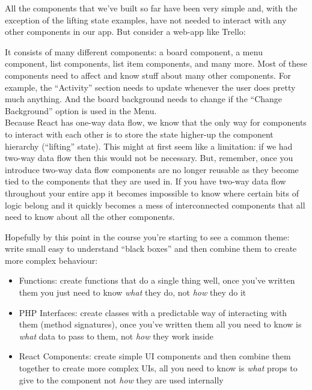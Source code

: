 

\pagebreak

All the components that we've built so far have been very simple and, with the exception of the lifting state examples, have not needed to interact with any other components in our app. But consider a web-app like Trello:


It consists of many different components: a board component, a menu component, list components, list item components, and many more. Most of these components need to affect and know stuff about many other components. For example, the ``Activity'' section needs to update whenever the user does pretty much anything. And the board background needs to change if the ``Change Background'' option is used in the Menu.
\\

Because React has one-way data flow, we know that the only way for components to interact with each other is to store the state higher-up the component hierarchy (``lifting'' state). This might at first seem like a limitation: if we had two-way data flow then this would not be necessary. But, remember, once you introduce two-way data flow components are no longer reusable as they become tied to the components that they are used in. If you have two-way data flow throughout your entire app it becomes impossible to know where certain bits of logic belong and it quickly becomes a mess of interconnected components that all need to know about all the other components.

\pagebreak

Hopefully by this point in the course you're starting to see a common theme: write small easy to understand ``black boxes'' and then combine them to create more complex behaviour:

\begin{itemize}
    \item Functions: create functions that do a single thing well, once you've written them you just need to know \textit{what} they do, not \textit{how} they do it
    \item PHP Interfaces: create classes with a predictable way of interacting with them (method signatures), once you've written them all you need to know is \textit{what} data to pass to them, not \textit{how} they work inside
    \item React Components: create simple UI components and then combine them together to create more complex UIs, all you need to know is \textit{what} props to give to the component not \textit{how} they are used internally
\end{itemize}

